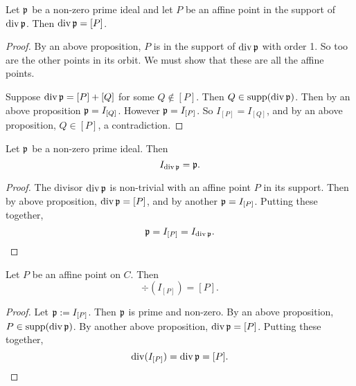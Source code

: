 \begin{proposition}
  Let $\frak p$ be a non-zero prime ideal and let $P$ be an affine point in the support of $\div \frak p$.
  Then $\div \frak p = [P]$.
\end{proposition}
\begin{proof}
  By an above proposition, $P$ is in the support of $\div \frak p$ with order 1.
  So too are the other points in its orbit. 
  We must show that these are all the affine points.
  
  Suppose $\div \frak p = [P] + [Q]$ for some $Q \not\in [P]$.
  Then $Q \in \supp(\div \frak p)$.
  Then by an above proposition $\frak p = I_{[Q]}$.
  However $\frak p = I_{[P]}$.
  So $I_{[P]} = I_{[Q]}$, and by an above proposition, $Q \in [P]$, a contradiction.
\end{proof}

\begin{proposition}
  Let $\frak p$ be a non-zero prime ideal. Then
  \[ I_{\div \frak p} = \frak p. \]
\end{proposition}
\begin{proof}
  The divisor $\div \frak p$ is non-trivial with an affine point $P$ in its support.
  Then by above proposition, $\div \frak p = [P]$,
  and by another $\frak p = I_{[P]}$.
  Putting these together,
  \[ \frak p = I_{[P]} = I_{\div \frak p}. \]
\end{proof}
\begin{comment}
\begin{proof}
  Let $a \in \frak p$.
  Then at every affine point $P$ on $C$,
  \[ \ord_P(\div \frak p) = \min_{0 \neq f \in \frak p}\{ \nu_P(f) \} \leq \nu_P(a), \]
  so $a \in I_{\div \frak p}$.
  
  Let $b \in I_{\div \frak p}$.
  At every affine point $P$ on $C$, $\nu_P(b) \geq 0$.
  At every affine point $P \in \supp(\div \frak p)$,
  \[ \nu_P(b) \geq \ord_P(D). \]
  
  Let $b \in I_{\div \frak p}$.
  Let $P \in \supp(\div \frak p)$.
  By above proposition, $I_{\div \frak p} = I_{[P]}$, so $b \in I_{[P]}$.
  By another proposition above, $\frak p = I_{[P]}$, so $b \in \frak p$.
  Then $b \in I_{[P]}$.
\end{proof}
\end{comment}

\begin{proposition}
  Let $P$ be an affine point on $C$. Then
  \[ \div(I_{[P]}) = [P]. \]
\end{proposition}
\begin{proof}
  Let $\frak p := I_{[P]}$.
  Then $\frak p$ is prime and non-zero.
  By an above proposition, $P \in \supp(\div \frak p)$.
  By another above proposition, $\div \frak p = [P]$.
  Putting these together,
  \[ \div(I_{[P]}) = \div \frak p = [P]. \]
\end{proof}



